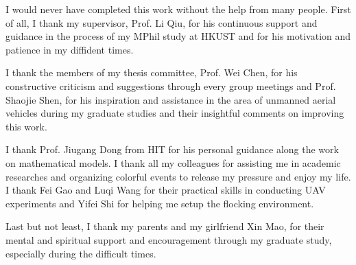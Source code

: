 \acknowledgments

I would never have completed this work without the help from many people. First of all, I thank my supervisor, Prof. Li Qiu, for his continuous support and guidance in the process of my MPhil study at HKUST and for his motivation and patience in my diffident times.

I thank the members of my thesis committee, Prof. Wei Chen, for his constructive criticism and suggestions through every group meetings and Prof. Shaojie Shen, for his inspiration and assistance in the area of unmanned aerial vehicles during my graduate studies and their insightful comments on improving this work.

I thank Prof. Jiugang Dong from HIT for his personal guidance along the work on mathematical models. I thank all my colleagues for assisting me in academic researches and organizing colorful events to release my pressure and enjoy my life. I thank Fei Gao and Luqi Wang for their practical skills in conducting UAV experiments and Yifei Shi for helping me setup the flocking environment.

Last but not least, I thank my parents and my girlfriend Xin Mao, for their mental and spiritual support and encouragement through my graduate study, especially during the difficult times.

\endacknowledgments
